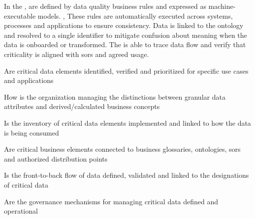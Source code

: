 %
%

\ekgmmContextSection

In the ,  are defined by data quality business rules
and expressed as machine-executable models.
,
These rules are automatically executed across systems, processes and applications to ensure consistency.
Data is linked to the ontology and resolved to a single identifier to mitigate confusion about meaning when the
data is onboarded or transformed.
The  is able to trace data flow and verify that criticality is aligned with \glspl{sor}
and agreed usage.

\ekgmmcorequestionssection

\begin{core-questions}

  \item [\thesection.1] Are critical data elements identified, verified and prioritized for specific
                        use cases and applications
  \item [\thesection.2] How is the organization managing the distinctions between granular data attributes and
                        derived/calculated business concepts
  \item [\thesection.3] Is the inventory of critical data elements implemented and linked to how the
                        data is being consumed
  \item [\thesection.4] Are critical business elements connected to business glossaries, ontologies,
                        \glspl{sor} and authorized distribution points
  \item [\thesection.5] Is the front-to-back flow of data defined, validated and linked to the designations of
                        critical data
  \item [\thesection.6] Are the governance mechanisms for managing critical data defined and operational

\end{core-questions}

